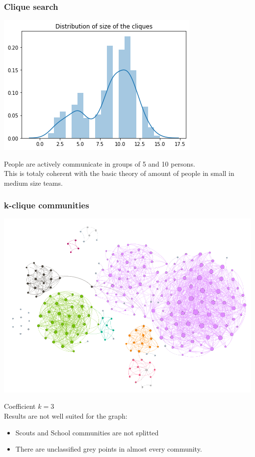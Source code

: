 \documentclass{beamer}
\begin{document}
\begin{frame}
\frametitle{Clique search}
\begin{multicols}{2}
	\includegraphics[width=\columnwidth]{clique_sizes.png}
	\columnbreak
	
	People are actively communicate in groups of 5 and 10 persons.\\This is totaly coherent with the basic theory of amount of people in small in medium size teams.
\end{multicols}

\end{frame}


\begin{frame}
\frametitle{k-clique communities}
\begin{multicols}{2}
	\includegraphics[width=\columnwidth]{kclique_comunity.png}
	\columnbreak
	
	Coefficient $k=3$\\
	\medskip
		Results are not well suited for the graph:
		\begin{itemize}
		\item Scouts and School communities are not splitted
		\item There are unclassified grey points in almost every community.
		\end{itemize}
\end{multicols}

\end{frame}
\end{document}
